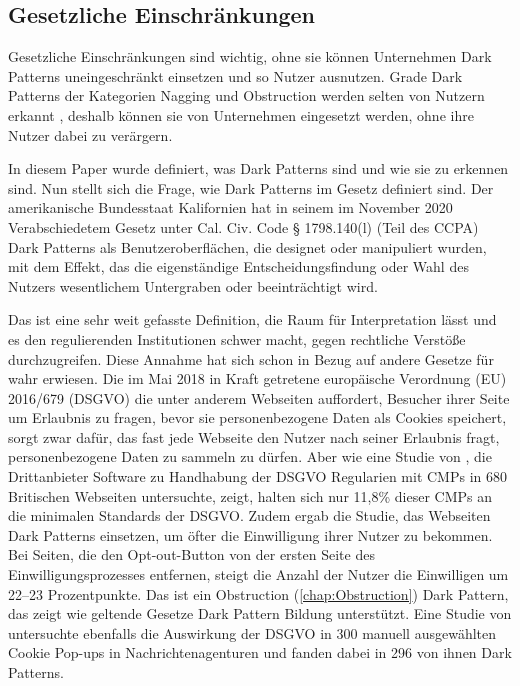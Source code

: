 \documentclass[conference,compsoc,final,a4paper]{IEEEtran}
\begin{document}



\subsection{Gesetzliche Einschränkungen}
Gesetzliche Einschränkungen sind wichtig, ohne sie können Unternehmen Dark Patterns uneingeschränkt einsetzen und so Nutzer ausnutzen. Grade Dark Patterns der Kategorien Nagging und Obstruction werden selten von Nutzern erkannt \autocites{Gray_2018}{M.Bhoot2020}, deshalb können sie von Unternehmen eingesetzt werden, ohne ihre Nutzer dabei zu verärgern.

In diesem Paper wurde definiert, was Dark Patterns sind und wie sie zu erkennen sind. Nun stellt sich die Frage, wie Dark Patterns im Gesetz definiert sind. Der amerikanische Bundesstaat Kalifornien hat in seinem im November 2020 Verabschiedetem Gesetz unter Cal. Civ. Code § 1798.140(l) (Teil des \ac{CCPA}) Dark Patterns als Benutzeroberflächen, die designet oder manipuliert wurden, mit dem Effekt, das die eigenständige Entscheidungsfindung oder Wahl des Nutzers wesentlichem Untergraben oder beeinträchtigt wird.

Das ist eine sehr weit gefasste Definition, die Raum für Interpretation lässt und es den regulierenden Institutionen schwer macht, gegen rechtliche Verstöße durchzugreifen. Diese Annahme hat sich schon in Bezug auf andere Gesetze für wahr erwiesen.
Die im Mai 2018 in Kraft getretene europäische Verordnung (EU) 2016/679 (\ac{DSGVO}) die unter anderem Webseiten auffordert, Besucher ihrer Seite um Erlaubnis zu fragen, bevor sie personenbezogene Daten als Cookies speichert, sorgt zwar dafür, das fast jede Webseite den Nutzer nach seiner Erlaubnis fragt, personenbezogene Daten zu sammeln zu dürfen. Aber wie eine Studie von \citeauthor{Nouwens2020} \autocite{Nouwens2020}, die Drittanbieter Software zu Handhabung der \ac{DSGVO} Regularien mit \acp{CMP} in 680 Britischen Webseiten untersuchte, zeigt, halten sich nur 11,8\% dieser \acp{CMP} an die minimalen Standards der \ac{DSGVO}. Zudem ergab die Studie, das Webseiten Dark Patterns einsetzen, um öfter die Einwilligung ihrer Nutzer zu bekommen. Bei Seiten, die den Opt-out-Button von der ersten Seite des Einwilligungsprozesses entfernen, steigt die Anzahl der Nutzer die Einwilligen um 22–23 Prozentpunkte. Das ist ein Obstruction (\autoref{chap:Obstruction}) Dark Pattern, das zeigt wie geltende Gesetze Dark Pattern Bildung unterstützt. Eine Studie von \citeauthor{Soe2020} \autocite{Soe2020} untersuchte ebenfalls die Auswirkung der \ac{DSGVO} in 300 manuell ausgewählten Cookie Pop-ups in Nachrichtenagenturen und fanden dabei in 296 von ihnen Dark Patterns.
\end{document}
